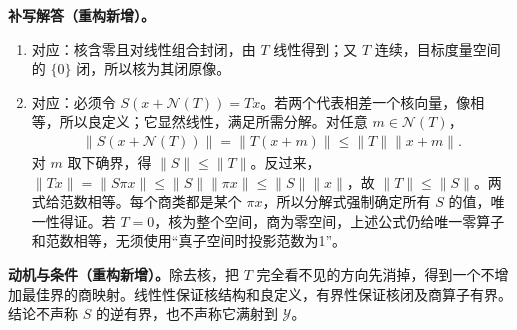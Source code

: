 \documentclass[../../main.tex]{subfiles}
\begin{document}
\begin{solution}
\textbf{补写解答（重构新增）。}
\begin{enumerate}
\item 对应：核含零且对线性组合封闭，由 $T$ 线性得到；又 $T$ 连续，目标度量空间的 $\{0\}$ 闭，所以核为其闭原像。
\item 对应：必须令 $S(x+\mathcal N(T))=Tx$。若两个代表相差一个核向量，像相等，所以良定义；它显然线性，满足所需分解。对任意 $m\in\mathcal N(T)$，
\begin{align*}
\|S(x+\mathcal N(T))\|=\|T(x+m)\|\le\|T\|\|x+m\|.
\end{align*}
对 $m$ 取下确界，得 $\|S\|\le\|T\|$。反过来，$\|Tx\|=\|S\pi x\|\le\|S\|\|\pi x\|\le\|S\|\|x\|$，故 $\|T\|\le\|S\|$。两式给范数相等。每个商类都是某个 $\pi x$，所以分解式强制确定所有 $S$ 的值，唯一性得证。若 $T=0$，核为整个空间，商为零空间，上述公式仍给唯一零算子和范数相等，无须使用“真子空间时投影范数为1”。
\end{enumerate}
\end{solution}
\begin{remark}
\textbf{动机与条件（重构新增）。}除去核，把 $T$ 完全看不见的方向先消掉，得到一个不增加最佳界的商映射。线性性保证核结构和良定义，有界性保证核闭及商算子有界。结论不声称 $S$ 的逆有界，也不声称它满射到 $\mathcal Y$。
\end{remark}
\end{document}
